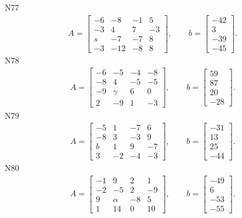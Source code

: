 \documentclass[11pt]{report}
\begin{document}
N77
\begin{align*}
 A = \left[\begin{matrix}-6 & -8 & -1 & 5\\-3 & 4 & 7 & -3\\s & -7 & -7 & 8\\-3 & -12 & -8 & 8\end{matrix}\right],
\qquad b = \left[\begin{matrix}-42\\3\\-39\\-45\end{matrix}\right]. 
 \end{align*}
N78
\begin{align*}
 A = \left[\begin{matrix}-6 & -5 & -4 & -8\\-8 & 4 & -5 & -5\\-9 & \gamma & 6 & 0\\2 & -9 & 1 & -3\end{matrix}\right],
\qquad b = \left[\begin{matrix}59\\87\\20\\-28\end{matrix}\right]. 
 \end{align*}
N79
\begin{align*}
 A = \left[\begin{matrix}-5 & 1 & -7 & 6\\-8 & 3 & -3 & 9\\b & 1 & 9 & -7\\3 & -2 & -4 & -3\end{matrix}\right],
\qquad b = \left[\begin{matrix}-31\\13\\25\\-44\end{matrix}\right]. 
 \end{align*}
N80
\begin{align*}
 A = \left[\begin{matrix}-1 & 9 & 2 & 1\\-2 & -5 & 2 & -9\\9 & \alpha & -8 & 5\\1 & 14 & 0 & 10\end{matrix}\right],
\qquad b = \left[\begin{matrix}-49\\6\\-53\\-55\end{matrix}\right]. 
 \end{align*}
\end{document}

